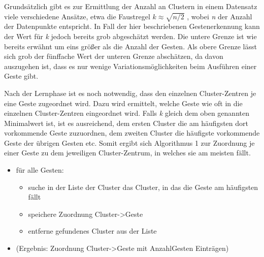 Grundsätzlich gibt es zur Ermittlung der Anzahl an Clustern in einem Datensatz viele verschiedene Ansätze, etwa die Faustregel $k \approx \sqrt{n/2}$ \cite{WikipediaKMeansKValue}, wobei \emph{n} der Anzahl der Datenpunkte entspricht. In Fall der hier beschriebenen Gestenerkennung kann der Wert für \emph{k} jedoch bereits grob abgeschätzt werden. 
Die untere Grenze ist wie bereits erwähnt um eins größer als die Anzahl der Gesten.
Als obere Grenze lässt sich grob der fünffache Wert der unteren Grenze abschätzen, da davon auszugehen ist, dass es nur wenige Variationsmöglichkeiten beim Ausführen einer Geste gibt.







Nach der Lernphase ist es noch notwendig, dass den einzelnen Cluster-Zentren je eine Geste zugeordnet wird. Dazu wird ermittelt, welche Geste wie oft in die einzelnen Cluster-Zentren eingeordnet wird. Falls \emph{k} gleich dem oben genannten Minimalwert ist, ist es ausreichend, dem ersten Cluster die am häufigsten dort vorkommende Geste zuzuordnen, dem zweiten Cluster die häufigste vorkommende Geste der übrigen Gesten etc. 
Somit ergibt sich 
Algorithmus 1 
zur Zuordnung je einer Geste zu dem jeweiligen Cluster-Zentrum, in welches sie am meisten fällt.
\begin{itemize}
    
    \item für alle Gesten:
    \begin{itemize}
    
        \item suche in der Liste der Cluster das Cluster, in das die Geste am häufigsten fällt
        \item speichere Zuordnung Cluster->Geste
        \item entferne gefundenes Cluster aus der Liste
        \end{itemize}

    \item (Ergebnis: Zuordnung Cluster->Geste mit AnzahlGesten Einträgen)

\end{itemize}


